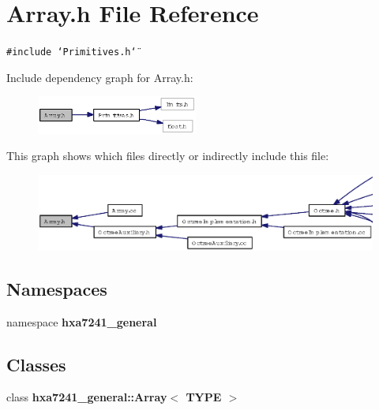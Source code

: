 \section{Array.h File Reference}
\label{Array_8h}
{\tt \#include \char`\"{}Primitives.h\char`\"{}}\par


Include dependency graph for Array.h:\begin{figure}[H]
\begin{center}
\leavevmode
\includegraphics[width=150pt]{Array_8h__incl}
\end{center}
\end{figure}


This graph shows which files directly or indirectly include this file:\begin{figure}[H]
\begin{center}
\leavevmode
\includegraphics[width=394pt]{Array_8h__dep__incl}
\end{center}
\end{figure}
\subsection*{Namespaces}
\begin{CompactItemize}
\item 
namespace {\bf hxa7241\_\-general}
\end{CompactItemize}
\subsection*{Classes}
\begin{CompactItemize}
\item 
class {\bf hxa7241\_\-general::Array$<$ TYPE $>$}
\end{CompactItemize}
